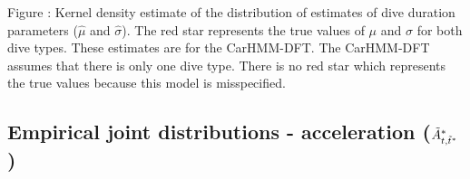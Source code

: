 \documentclass{article}
\begin{document}
        \noindent Figure : Kernel density estimate of the distribution of estimates of dive duration parameters ($\hat \mu$ and $\hat \sigma$). The red star represents the true values of $\mu$ and $\sigma$ for both dive types. These estimates are for the CarHMM-DFT. The CarHMM-DFT assumes that there is only one dive type. There is no red star which represents the true values because this model is misspecified.
        \addtocounter{fignum}{1}
    
    \newpage
    \subsection{Empirical joint distributions - acceleration ($\tilde{A}^*_{t,\tilde t^*}$)}

        \begin{center}
\end{center}
\end{document}
